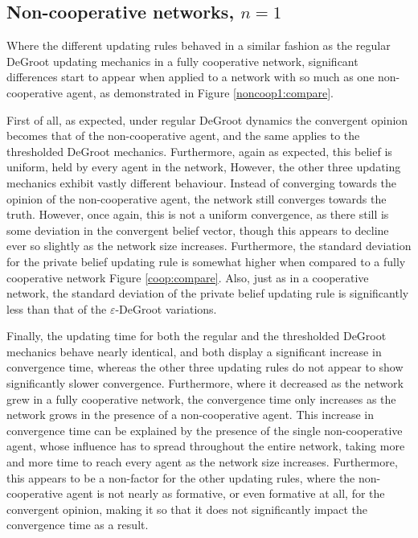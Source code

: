 \documentclass{article}
\begin{document}
\newpage

\subsection{Non-cooperative networks, $n=1$}

Where the different updating rules behaved in a similar fashion as the regular DeGroot updating mechanics in a fully cooperative network, significant differences start to appear when applied to a network with so much as one non-cooperative agent, as demonstrated in Figure \ref{noncoop1:compare}. 

\noindent First of all, as expected, under regular DeGroot dynamics the convergent opinion becomes that of the non-cooperative agent, and the same applies to the thresholded DeGroot mechanics. Furthermore, again as expected, this belief is uniform, held by every agent in the network, However, the other three updating mechanics exhibit vastly different behaviour. Instead of converging towards the opinion of the non-cooperative agent, the network still converges towards the truth. However, once again, this is not a uniform convergence, as there still is some deviation in the convergent belief vector, though this appears to decline ever so slightly as the network size increases. Furthermore, the standard deviation for the private belief updating rule is somewhat higher when compared to a fully cooperative network Figure \ref{coop:compare}. Also, just as in a cooperative network, the standard deviation of the private belief updating rule is significantly less than that of the $\varepsilon$-DeGroot variations.

\noindent Finally, the updating time for both the regular and the thresholded DeGroot mechanics behave nearly identical, and both display a significant increase in convergence time, whereas the other three updating rules do not appear to show significantly slower convergence. Furthermore, where it decreased as the network grew in a fully cooperative network, the convergence time only increases as the network grows in the presence of a non-cooperative agent. This increase in convergence time can be explained by the presence of the single non-cooperative agent, whose influence has to spread throughout the entire network, taking more and more time to reach every agent as the network size increases. Furthermore, this appears to be a non-factor for the other updating rules, where the non-cooperative agent is not nearly as formative, or even formative at all, for the convergent opinion, making it so that it does not significantly impact the convergence time as a result.
\end{document}
